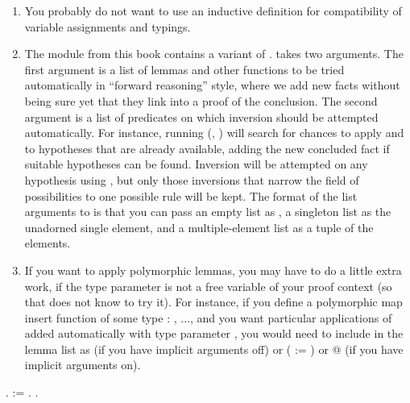 \documentclass[12pt]{report}
\begin{document}
\begin{enumerate}
\begin{enumerate}
\coqdocemptyline
    
    \item You probably do not want to use an inductive definition for compatibility of variable assignments and typings.
    \item The  module from this book contains a variant  of .   takes two arguments.  The first argument is a list of lemmas and other functions to be tried automatically in ``forward reasoning'' style, where we add new facts without being sure yet that they link into a proof of the conclusion.  The second argument is a list of predicates on which inversion should be attempted automatically.  For instance, running  (, )  will search for chances to apply  and  to hypotheses that are already available, adding the new concluded fact if suitable hypotheses can be found.  Inversion will be attempted on any hypothesis using , but only those inversions that narrow the field of possibilities to one possible rule will be kept.  The format of the list arguments to  is that you can pass an empty list as , a singleton list as the unadorned single element, and a multiple-element list as a tuple of the elements.
    \item If you want  to apply polymorphic lemmas, you may have to do a little extra work, if the type parameter is not a free variable of your proof context (so that  does not know to try it).  For instance, if you define a polymorphic map insert function  of some type \coqdockw{\ensuremath{\forall}}  : , ..., and you want particular applications of  added automatically with type parameter , you would need to include  in the lemma list as   (if you have implicit arguments off) or  ( := ) or @  (if you have implicit arguments on).
  \end{enumerate}





\end{enumerate} \begin{coqdoccode}
\coqdocemptyline
\coqdocnoindent
{} .\coqdoceol
\coqdocindent{1.00em}
  := .\coqdoceol
\coqdocemptyline
\coqdocnoindent
{} .\coqdoceol
\coqdocemptyline
\end{coqdoccode}
\end{document}
